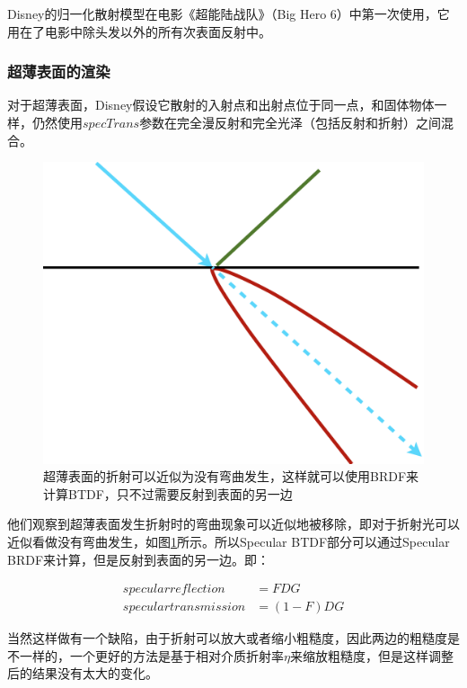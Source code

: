 Disney的归一化散射模型在电影《超能陆战队》（Big Hero 6）中第一次使用，它用在了电影中除头发以外的所有次表面反射中。




\subsubsection{超薄表面的渲染}
对于超薄表面，Disney假设它散射的入射点和出射点位于同一点，和固体物体一样，仍然使用$specTrans$参数在完全漫反射和完全光泽（包括反射和折射）之间混合。

\begin{figure}
\sidecaption
	\includegraphics[width=.35\textwidth]{figures/intro/thin-refraction}
	\caption{超薄表面的折射可以近似为没有弯曲发生，这样就可以使用BRDF来计算BTDF，只不过需要反射到表面的另一边}
	\label{f:intro-thin-1}
\end{figure}

他们观察到超薄表面发生折射时的弯曲现象可以近似地被移除，即对于折射光可以近似看做没有弯曲发生，如图\ref{f:intro-thin-1}所示。所以Specular BTDF部分可以通过Specular BRDF来计算，但是反射到表面的另一边。即：

\begin{equation}
	\begin{aligned}
		specular reflection &= FDG\\
specular transmission &= (1-F)DG
	\end{aligned}
\end{equation}

\noindent 当然这样做有一个缺陷，由于折射可以放大或者缩小粗糙度，因此两边的粗糙度是不一样的，一个更好的方法是基于相对介质折射率$\eta$来缩放粗糙度，但是这样调整后的结果没有太大的变化。

